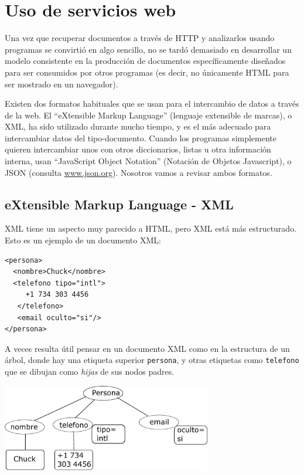 
\chapter{Uso de servicios web}

Una vez que recuperar documentos a través de HTTP y analizarlos usando
programas se convirtió en algo sencillo,
no se tardó demasiado en desarrollar un modelo
consistente en la producción de
documentos específicamente diseñados para ser consumidos por otros
programas (es decir, no únicamente HTML para ser mostrado en un navegador).

Existen dos formatos habituales que se usan para el intercambio de datos a través de la web.
El ``eXtensible Markup Language'' (lenguaje extensible de marcas), o XML, ha sido utilizado
durante mucho tiempo, y es el más adecuado para intercambiar datos del tipo-documento.
Cuando los programas simplemente quieren intercambiar unos con otros diccionarios, listas u otra
información interna, usan ``JavaScript Object Notation'' (Notación de Objetos Javascript), o JSON
(consulta \url{www.json.org}). Nosotros vamos a revisar ambos formatos.

\section{eXtensible Markup Language - XML}

XML tiene un aspecto muy parecido a HTML, pero XML está más estructurado.
Esto es un ejemplo de un documento XML:

\beforeverb
\begin{verbatim}
<persona>
  <nombre>Chuck</nombre>
  <telefono tipo="intl">
     +1 734 303 4456
   </telefono>
   <email oculto="si"/>
</persona>
\end{verbatim}
\afterverb
%
A veces resulta útil pensar en un documento XML como en la estructura de un árbol,
donde hay una etiqueta superior {\tt persona}, y otras etiquetas como {\tt telefono}
que se dibujan como \emph{hijas} de sus nodos padres.

\beforefig
\centerline{\includegraphics[height=1.50in]{figs2/xml-tree.eps}}
\afterfig

